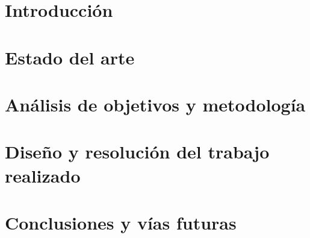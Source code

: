 
\chapter{Introducción}



\chapter{Estado del arte}




\chapter{Análisis de objetivos y metodología}



\chapter{Diseño y resolución del trabajo realizado}




\chapter{Conclusiones y vías futuras}
